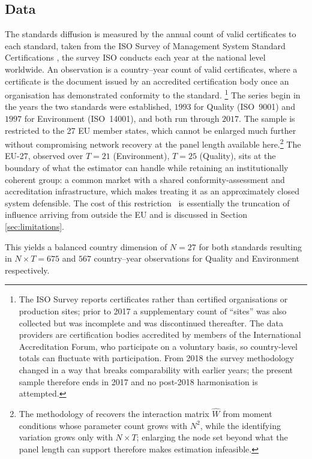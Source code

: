 \documentclass[12pt,a4paper]{article}
\begin{document}
\subsection{Data}
\label{sec:data}
The standards diffusion is measured by the annual count of valid certificates to each standard, taken
from the ISO Survey of Management System Standard Certifications \citep{ISOsurvey}, the survey ISO conducts
each year at the national level worldwide. An observation is a
country--year count of valid certificates, where a certificate is the document issued by an
accredited certification body once an organisation has demonstrated conformity to the
standard. \footnote{The ISO Survey reports certificates rather than certified organisations
    or production sites; prior to 2017 a supplementary count of ``sites'' was also collected but
    was incomplete and was discontinued thereafter. The data providers are certification bodies
    accredited by members of the International Accreditation Forum, who participate on a
    voluntary basis, so country-level totals can fluctuate with participation. From 2018 the
    survey methodology changed in a way that breaks comparability with earlier years; the present
    sample therefore ends in 2017 and no post-2018 harmonisation is attempted.} The series begin
in the years the two standards were established, $1993$ for Quality (ISO~9001) and $1997$ for
Environment (ISO~14001), and both run through $2017$. The sample is restricted to the 27 EU member states, which cannot be enlarged much further without compromising network recovery at the panel length available here.\footnote{The methodology of \citet{depaula2025} recovers the interaction matrix $\hat{W}$ from moment conditions whose parameter count grows with $N^2$, while the identifying variation grows only with $N \times T$; enlarging the node set beyond what the panel length can support therefore makes estimation infeasible.} The EU-27, observed over $T=21$ (Environment), $T = 25$ (Quality), sits at the boundary of what the estimator can handle while retaining an institutionally coherent group: a common market with a shared conformity-assessment and accreditation infrastructure, which makes treating it as an approximately closed system defensible. The cost of this restriction  is essentially the truncation of influence arriving from outside the EU and is discussed in Section \ref{sec:limitations}.

This yields a balanced country dimension of $N=27$ for both standards resulting in $N\times T = 675$ and $567$ country--year observations for Quality and Environment respectively.
\end{document}
